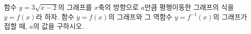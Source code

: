 \hspace*{2mm}\begin{minipage}[t]{\dimexpr\linewidth-2mm\relax}\vspace{0pt}
함수 $y=3\sqrt{x-2}$의 그래프를 $x$축의 방향으로 $a$만큼 평행이동한 그래프의 식을 $y=f(x)$라 하자. 함수 $y=f(x)$의 그래프와 그 역함수 $y=f^{-1}(x)$의 그래프가 접할 때, $a$의 값을 구하시오.\end{minipage}
